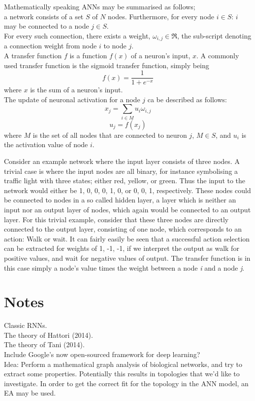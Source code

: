 \\
\\
Mathematically speaking ANNs may be summarised as follows;
\\
a network consists of a set $S$ of $N$ nodes. Furthermore, for every node $i\in S$: $i$ may be connected to a node $j \in S$.
\\
For every such connection, there exists a weight, $\omega_{i,j} \in \Re$, the sub-script denoting a connection weight from node $i$ to node $j$.
\\
A transfer function $f$ is a function $f(x)$ of a neuron's input, $x$. A commonly used transfer function is the sigmoid transfer function, simply being 
\begin{equation}
    f(x) = \frac{1}{1+e^{-x}}
\end{equation}
where $x$ is the sum of a neuron's input.
\\
The update of neuronal activation for a node $j$ ca be described as follows:
\\
\begin{equation}
    x_j = \sum_{i\in M} u_i \omega_{i,j}
\end{equation}
\begin{equation}
    u_j = f(x_j)
\end{equation}
where $M$ is the set of all nodes that are connected to neuron $j$, $M \in S$, and $u_i$ is the activation value of node $i$.

Consider an example network where the input layer consists of three nodes. A trivial case is where the input nodes are all binary, for instance symbolising a traffic light with three states; either red, yellow, or green. Thus the input to the network would either be {1, 0, 0}, {0, 1, 0}, or {0, 0, 1}, respectively. These nodes could be connected to nodes in a so called hidden layer, a layer which is neither an input nor an output layer of nodes, which again would be connected to an output layer. For this trivial example, consider that these three nodes are directly connected to the output layer, consisting of one node, which corresponds to an action: Walk or wait. It can fairly easily be seen that a successful action selection can be extracted for weights of {1, -1, -1}, if we interpret the output as walk for positive values, and wait for negative values of output. The transfer function is in this case simply a node's value times the weight between a node \textit{i} and a node \textit{j}.


\section{Notes}
Classic RNNs.
\\
The theory of Hattori (2014).
\\
The theory of Tani (2014).
\\
Include Google's now open-sourced framework for deep learning?
\\
Idea: Perform a mathematical graph analysis of biological networks, and try to extract some properties. Potentially this results in topologies that we'd like to investigate. In order to get the correct fit for the topology in the ANN model, an EA may be used.


\cleardoublepage